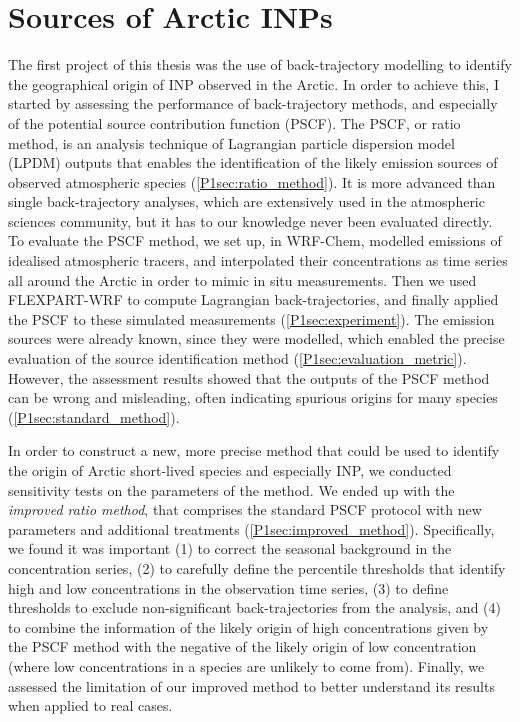\section{Sources of Arctic INPs}
The first project of this thesis was the use of back-trajectory modelling to identify the geographical origin of INP observed in the Arctic. In order to achieve this, I started by assessing the performance of back-trajectory methods, and especially of the potential source contribution function (PSCF).
The PSCF, or ratio method, is an analysis technique of Lagrangian particle dispersion model (LPDM) outputs that enables the identification of the likely emission sources of observed atmospheric species (\cref{P1sec:ratio_method}).
It is more advanced than single back-trajectory analyses, which are extensively used in the atmospheric sciences community, but it has to our knowledge never been evaluated directly.
To evaluate the PSCF method, we set up, in WRF-Chem, modelled emissions of idealised atmospheric tracers, and interpolated their concentrations as time series all around the Arctic in order to mimic in situ measurements. 
Then we used FLEXPART-WRF to compute Lagrangian back-trajectories, and finally applied the PSCF to these simulated measurements (\cref{P1sec:experiment}).
The emission sources were already known, since they were modelled, which enabled the precise evaluation of the source identification method (\cref{P1sec:evaluation_metric}).
However, the assessment results showed that the outputs of the PSCF method can be wrong and misleading, often indicating spurious origins for many species (\cref{P1sec:standard_method}).

In order to construct a new, more precise method that could be used to identify the origin of Arctic short-lived species and especially INP, we conducted sensitivity tests on the parameters of the method.
We ended up with the \textit{improved ratio method}, that comprises the standard PSCF protocol with new parameters and additional treatments (\cref{P1sec:improved_method}). Specifically, we found it was important (1) to correct the seasonal background in the concentration series, (2) to carefully define the percentile thresholds that identify high and low concentrations in the observation time series, (3) to define thresholds to exclude non-significant back-trajectories from the analysis, and (4) to combine the information of the likely origin of high concentrations given by the PSCF method with the negative of the likely origin of low concentration (where low concentrations in a species are unlikely to come from). Finally, we assessed the limitation of our improved method to better understand its results when applied to real cases.
\vspace{\baselineskip}

